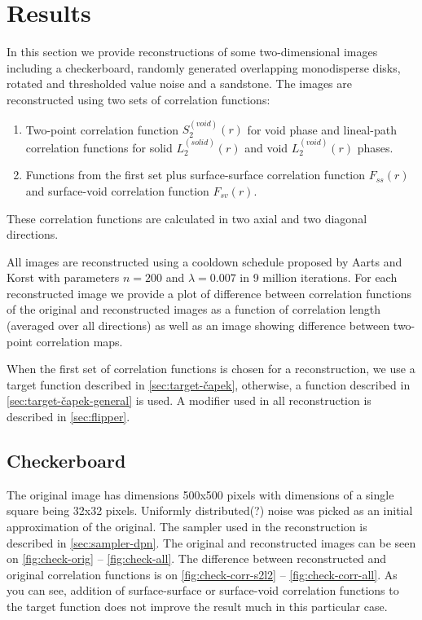 \documentclass[preprint,amsmath,amssymb,aps,pre,nofootinbib]{revtex4-1}
\begin{document}
\section{Results}
In this section we provide reconstructions of some two-dimensional images
including a checkerboard, randomly generated overlapping monodisperse disks,
rotated and thresholded value noise and a sandstone. The images are
reconstructed using two sets of correlation functions:
\begin{enumerate}
\item Two-point correlation function $S_2^{(void)}(r)$ for void phase and
  lineal-path correlation functions for solid $L_2^{(solid)}(r)$ and void
  $L_2^{(void)}(r)$ phases.
\item Functions from the first set plus surface-surface correlation function
  $F_{ss}(r)$ and surface-void correlation function $F_{sv}(r)$.
\end{enumerate}
These correlation functions are calculated in two axial and two diagonal
directions.

All images are reconstructed using a cooldown schedule proposed by Aarts and
Korst \cite{Aarts-Korst} with parameters $n = 200$ and $\lambda = 0.007$ in 9
million iterations. For each reconstructed image we provide a plot of difference
between correlation functions of the original and reconstructed images as a
function of correlation length (averaged over all directions) as well as an
image showing difference between two-point correlation maps.

When the first set of correlation functions is chosen for a reconstruction, we
use a target function described in \cref{sec:target-čapek}, otherwise, a
function described in \cref{sec:target-čapek-general} is used. A modifier used
in all reconstruction is described in \cref{sec:flipper}.

\subsection{Checkerboard}
The original image has dimensions 500x500 pixels with dimensions of a single
square being 32x32 pixels. Uniformly distributed(?) noise was picked as an
initial approximation of the original. The sampler used in the reconstruction is
described in \cref{sec:sampler-dpn}. The original and reconstructed images can
be seen on \cref{fig:check-orig} -- \cref{fig:check-all}. The difference between
reconstructed and original correlation functions is on
\cref{fig:check-corr-s2l2} -- \cref{fig:check-corr-all}. As you can see,
addition of surface-surface or surface-void correlation functions to the target
function does not improve the result much in this particular case.
\end{document}
